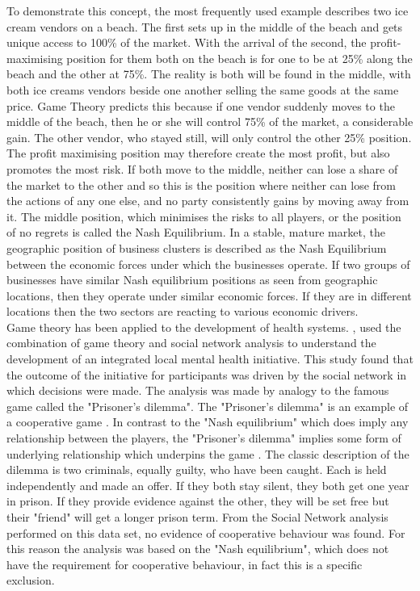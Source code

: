 \documentclass[11pt,a4paper]{article}
\begin{document}
To demonstrate this concept, the most frequently used example describes two ice cream vendors on a beach. The first sets up in the middle of the beach and gets unique access to 100\% of the market. With the arrival of the second, the profit-maximising position for them both on the beach is for one to be at 25\% along the beach and the other at 75\%. The reality is both will be found in the middle, with both ice creams vendors beside one another selling the same goods at the same price. Game Theory predicts this because if one vendor suddenly moves to the middle of the beach, then he or she will control 75\% of the market, a considerable gain. The other vendor, who stayed still, will only control the other 25\% position. The profit maximising position may therefore create the most profit, but also promotes the most risk. If both move to the middle, neither can lose a share of the market to the other and so this is the position where neither can lose from the actions of any one else, and no party consistently gains by moving away from it. The middle position, which minimises the risks to all players, or the position of no regrets is called the Nash Equilibrium. In a stable, mature market, the geographic position of business clusters is described as the Nash Equilibrium between the economic forces under which the businesses operate. If two groups of businesses have similar Nash equilibrium positions as seen from geographic locations, then they operate under similar economic forces. If they are in different locations then the two sectors are reacting to various economic drivers. \\

Game theory has been applied to the development of health systems. \citep{dobson2004sustainable}, used the combination of game theory and social network analysis to understand the development of an integrated local mental health initiative. This study found that the outcome of the initiative for participants was driven by the social network in which decisions were made. The analysis was made by analogy to the famous game called the "Prisoner's dilemma". The "Prisoner's dilemma" is an example of a cooperative game \citep{binmore2007game}. In contrast to the "Nash equilibrium" which does imply any relationship between the players, the "Prisoner's dilemma" implies some form of underlying relationship which underpins the game \citep{binmore2007game}. The classic description of the dilemma is two criminals, equally guilty, who have been caught. Each is held independently and made an offer. If they both stay silent, they both get one year in prison. If they provide evidence against the other, they will be set free but their "friend" will get a longer prison term. From the Social Network analysis performed on this data set, no evidence of cooperative behaviour was found. For this reason the analysis was based on the "Nash equilibrium", which does not have the requirement for cooperative behaviour, in fact this is a specific exclusion. \\
\end{document}
